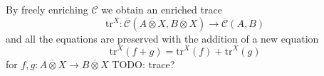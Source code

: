 \documentclass[acmsmall, screen, nonacm]{acmart}
\newcommand\enriched[1]{{\overline{\mathcal{#1}}}}
\begin{document}
By freely enriching $\mathcal{C}$ we obtain an enriched trace
\[
\text{tr}^{X} : \enriched{C}(A \overline{\otimes} X, B \overline{\otimes} X) \to \enriched{C}(A,B)
\]
and all the equations are preserved with the addition of a new equation
\[
  \text{tr}^{X}(f + g) = \text{tr}^{X}(f) + \text{tr}^{X}(g)
\]
for $f,g : A \overline{\otimes} X \to B \overline{\otimes} X$
TODO: trace?


\end{document}
